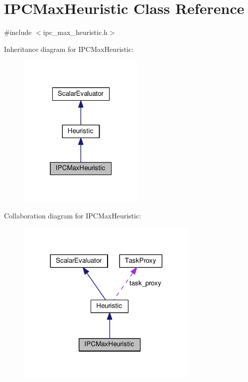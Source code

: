 \hypertarget{classIPCMaxHeuristic}{\section{I\-P\-C\-Max\-Heuristic Class Reference}
\label{classIPCMaxHeuristic}
}


{\ttfamily \#include $<$ipc\-\_\-max\-\_\-heuristic.\-h$>$}



Inheritance diagram for I\-P\-C\-Max\-Heuristic\-:
\nopagebreak
\begin{figure}[H]
\begin{center}
\leavevmode
\includegraphics[width=172pt]{classIPCMaxHeuristic__inherit__graph}
\end{center}
\end{figure}


Collaboration diagram for I\-P\-C\-Max\-Heuristic\-:
\nopagebreak
\begin{figure}[H]
\begin{center}
\leavevmode
\includegraphics[width=248pt]{classIPCMaxHeuristic__coll__graph}
\end{center}
\end{figure}
